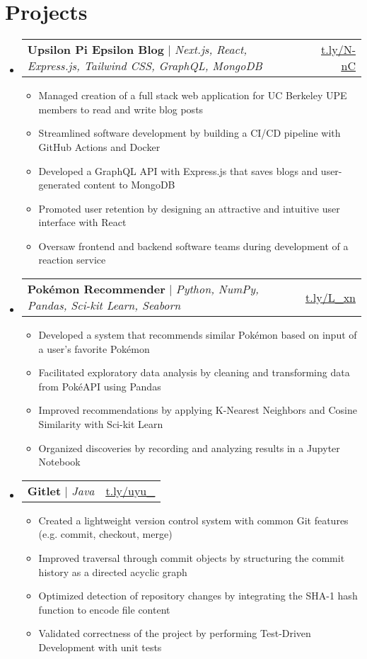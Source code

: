 \documentclass[letterpaper,11pt]{article}
\makeatletter
\newcommand{\resumeItem}[1]{
  \item\small{
    {#1 \vspace{-2pt}}
  }
}
\newcommand{\resumeProjectHeading}[2]{
    \item
    \begin{tabular*}{0.97\textwidth}{l@{\extracolsep{\fill}}r}
      \small#1 & #2 \\
    \end{tabular*}\vspace{-7pt}
}
\newcommand{\resumeSubHeadingListStart}{\begin{itemize}[leftmargin=0.15in, label={}]}
\newcommand{\resumeSubHeadingListEnd}{\end{itemize}}
\newcommand{\resumeItemListStart}{\begin{itemize}}
\newcommand{\resumeItemListEnd}{\end{itemize}\vspace{-5pt}}
\makeatother
\begin{document}
\section{\textbf{Projects}}
    \resumeSubHeadingListStart
      \resumeProjectHeading
          {\textbf{Upsilon Pi Epsilon Blog} $|$ \emph{Next.js, React, Express.js, Tailwind CSS, GraphQL, MongoDB}}{\href{https://github.com/upenu}{\underline{t.ly/N-nC}}}
          \resumeItemListStart
            \resumeItem{Managed creation of a full stack web application for UC Berkeley UPE members to read and write blog posts}
            \resumeItem{Streamlined software development by building a CI/CD pipeline with GitHub Actions and Docker}
            \resumeItem{Developed a GraphQL API with Express.js that saves blogs and user-generated content to MongoDB}
            \resumeItem{Promoted user retention by designing an attractive and intuitive user interface with React}
            \resumeItem{Oversaw frontend and backend software teams during development of a reaction service}
          \resumeItemListEnd
      \resumeProjectHeading
          {\textbf{Pok\'emon Recommender} $|$ \emph{Python, NumPy, Pandas, Sci-kit Learn, Seaborn}}{\href{https://github.com/huytt621/pokemon-recommender}{\underline{t.ly/L\_xn}}}
          \resumeItemListStart
            \resumeItem{Developed a system that recommends similar Pok\'emon based on input of a user's favorite Pok\'emon}
            \resumeItem{Facilitated exploratory data analysis by cleaning and transforming data from Pok\'eAPI using Pandas}
            \resumeItem{Improved recommendations by applying K-Nearest Neighbors and Cosine Similarity with Sci-kit Learn}
            \resumeItem{Organized discoveries by recording and analyzing results in a Jupyter Notebook}
          \resumeItemListEnd
      \resumeProjectHeading
          {\textbf{Gitlet} $|$ \emph{Java}}{\href{https://gitfront.io/r/huytt621/6546c41e067e9f94621b90d764d7d16da3abb527/gitlet/}{\underline{t.ly/uyu\_}}}
          \resumeItemListStart
            \resumeItem{Created a lightweight version control system with common Git features (e.g. commit, checkout, merge)}
            \resumeItem{Improved traversal through commit objects by structuring the commit history as a directed acyclic graph}
            \resumeItem{Optimized detection of repository changes by integrating the SHA-1 hash function to encode file content}
            \resumeItem{Validated correctness of the project by performing Test-Driven Development with unit tests}
          \resumeItemListEnd
    \resumeSubHeadingListEnd



\end{document}
